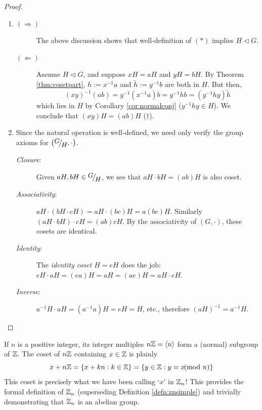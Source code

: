 \begin{proof}
	\begin{enumerate}
	  \item\begin{description}
	  	\item[$(\Rightarrow)$] The above discussion shows that well-definition of $(\ast)$ implies $H\triangleleft G$.
	  	\item[$(\Leftarrow)$] Assume $H\triangleleft G$, and suppose $xH=aH$ and $yH=bH$. By Theorem \ref{thm:cosetpart}, $h:=x^{-1}a$ and $\tilde h:=y^{-1}b$ are both in $H$. But then,
		\[
			(xy)^{-1}(ab)=y^{-1}(x^{-1}a)b =y^{-1}hb =(y^{-1}hy)\tilde h
		\]
		which lies in $H$ by Corollary \ref{cor:normalconj} ($y^{-1}hy\in H$). We conclude that $(xy)H=(ab)H$ ($\dag$).
	  \end{description}
	  \item	Since the natural operation is well-defined, we need only verify the group axioms for $\left(\quotient GH,\cdot\right)$.
		\begin{description}
			\item[\normalfont\emph{Closure}:] Given $aH,bH\in\quotient GH$, we see that $aH\cdot bH=(ab)H$ is also coset.
			\item[\normalfont\emph{Associativity}:] $aH\cdot(bH\cdot cH)=aH\cdot(bc)H=a(bc)H$. Similarly $(aH\cdot bH)\cdot cH=(ab)cH$. By the associativity of $(G,\cdot)$, these cosets are identical.
			\item[\normalfont\emph{Identity}:] The \emph{identity coset} $H=eH$ does the job: $eH\cdot aH=(ea)H=aH=(ae)H=aH\cdot eH$.
			\item[\normalfont\emph{Inverse}:] $a^{-1}H\cdot aH=(a^{-1}a)H=eH=H$, etc., therefore $(aH)^{-1}=a^{-1}H$.\qedhere
		\end{description}
	\end{enumerate}
\end{proof}


\goodbreak



If $n$ is a positive integer, its integer multiples $n\mathbb{Z}=\left\langle n\right\rangle$ form a (normal) subgroup of $\mathbb{Z}$. The coset of $n\mathbb{Z}$ containing $x\in\mathbb{Z}$ is plainly
\[
	x+n\mathbb{Z}=\{x+kn:k\in\mathbb{Z}\}
	=\{y\in\mathbb{Z}:y\equiv x\negthickspace\negthickspace\pmod n\}
\]
This coset is precisely what we have been calling `$x$' in $\mathbb{Z}_n$! This provides the formal definition of $\mathbb{Z}_n$ (superseding Definition \ref{defn:znsimple}) and trivially demonstrating that $\mathbb{Z}_n$ is an abelian group.

